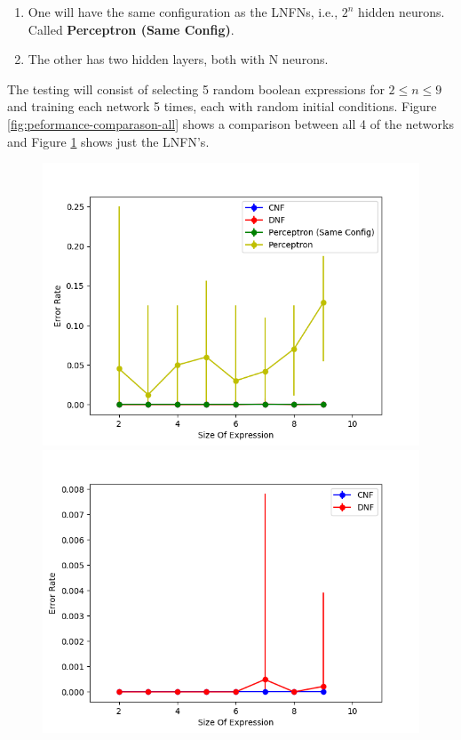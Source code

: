\begin{enumerate}
	\item One will have the same configuration as the LNFNs, i.e., $2^n$ hidden neurons. Called \textbf{Perceptron (Same Config)}. \label{lnfn-peformance:mlpn-arch-1}
	\item The other has two hidden layers, both with N neurons.
\end{enumerate}

The testing will consist of selecting 5 random boolean expressions for $2 \leq n \leq 9$ and training each network 5 times, each with random initial conditions. Figure \ref{fig:peformance-comparason-all} shows a comparison between all 4 of the networks and Figure \ref{fig:peformance-comparason-cnfdnf} shows just the LNFN's.

\begin{figure}[H]
  \centering
  \begin{minipage}[b]{0.45\textwidth}
    \includegraphics[width=\textwidth]{all-peformance.png}
    \caption{}
    \label{fig:peformance-comparason-all}
  \end{minipage}
  \begin{minipage}[b]{0.45\textwidth}
    \includegraphics[width=\textwidth]{lnfn-peformance.png}
    \caption{}
    \label{fig:peformance-comparason-cnfdnf}
  \end{minipage}
  \hfill
\end{figure}

